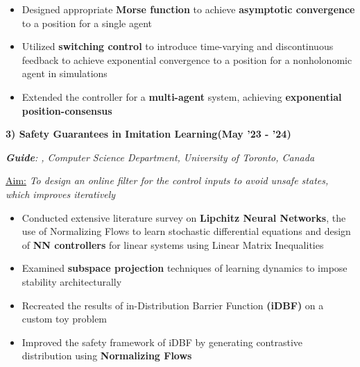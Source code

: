 \documentclass[10pt,letterpaper,sans]{moderncv}        %
\newcommand\x{1}
\newcommand\y{4}
\begin{document}
\begin{itemize}
\item Designed appropriate \textbf{Morse function} to achieve \textbf{asymptotic convergence} to a position for a single agent %
\item Utilized \textbf{switching control} to introduce time-varying and discontinuous feedback to achieve exponential convergence to a position for a nonholonomic agent in simulations
\item Extended the controller for a \textbf{multi-agent} system, achieving \textbf{exponential position-consensus} 
\end{itemize}


\hrulefill{}
\vspace{\y pt}

\textbf{3) Safety Guarantees in Imitation Learning}\hfill{\textbf{(May '23 - '24)}}

\textit{\textbf{Guide}: , Computer Science Department, University of Toronto, Canada} 

\vspace{\x pt}

\textcolor{mygray}{
\underline{Aim:}
\textit{To %
design an online filter for the control inputs to avoid unsafe states, which improves iteratively}
}\vspace{\x pt}
\begin{itemize}
    \item Conducted extensive literature survey on \textbf{Lipchitz Neural Networks}, the use of Normalizing Flows to learn stochastic differential equations and design of \textbf{NN controllers} for linear systems using Linear Matrix Inequalities
    \item Examined \textbf{subspace projection} techniques of learning dynamics to impose stability architecturally
    \item Recreated the results of in-Distribution Barrier Function \textbf{(iDBF)} on a custom toy problem
    \item Improved the safety framework of iDBF by generating contrastive distribution using \textbf{Normalizing Flows} 
\end{itemize}
\end{document}
